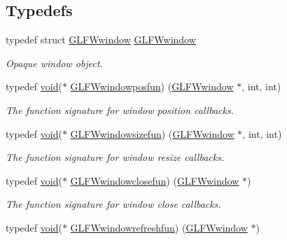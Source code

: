 \subsection*{Typedefs}
\begin{DoxyCompactItemize}
\item 
typedef struct \mbox{\hyperlink{group__window_ga3c96d80d363e67d13a41b5d1821f3242}{G\+L\+F\+Wwindow}} \mbox{\hyperlink{group__window_ga3c96d80d363e67d13a41b5d1821f3242}{G\+L\+F\+Wwindow}}
\begin{DoxyCompactList}\small\item\em Opaque window object. \end{DoxyCompactList}\item 
typedef \mbox{\hyperlink{glad_8h_a950fc91edb4504f62f1c577bf4727c29}{void}}($\ast$ \mbox{\hyperlink{group__window_gafd8db81fdb0e850549dc6bace5ed697a}{G\+L\+F\+Wwindowposfun}}) (\mbox{\hyperlink{group__window_ga3c96d80d363e67d13a41b5d1821f3242}{G\+L\+F\+Wwindow}} $\ast$, int, int)
\begin{DoxyCompactList}\small\item\em The function signature for window position callbacks. \end{DoxyCompactList}\item 
typedef \mbox{\hyperlink{glad_8h_a950fc91edb4504f62f1c577bf4727c29}{void}}($\ast$ \mbox{\hyperlink{group__window_gae49ee6ebc03fa2da024b89943a331355}{G\+L\+F\+Wwindowsizefun}}) (\mbox{\hyperlink{group__window_ga3c96d80d363e67d13a41b5d1821f3242}{G\+L\+F\+Wwindow}} $\ast$, int, int)
\begin{DoxyCompactList}\small\item\em The function signature for window resize callbacks. \end{DoxyCompactList}\item 
typedef \mbox{\hyperlink{glad_8h_a950fc91edb4504f62f1c577bf4727c29}{void}}($\ast$ \mbox{\hyperlink{group__window_ga93e7c2555bd837f4ed8b20f76cada72e}{G\+L\+F\+Wwindowclosefun}}) (\mbox{\hyperlink{group__window_ga3c96d80d363e67d13a41b5d1821f3242}{G\+L\+F\+Wwindow}} $\ast$)
\begin{DoxyCompactList}\small\item\em The function signature for window close callbacks. \end{DoxyCompactList}\item 
typedef \mbox{\hyperlink{glad_8h_a950fc91edb4504f62f1c577bf4727c29}{void}}($\ast$ \mbox{\hyperlink{group__window_ga7a56f9e0227e2cd9470d80d919032e08}{G\+L\+F\+Wwindowrefreshfun}}) (\mbox{\hyperlink{group__window_ga3c96d80d363e67d13a41b5d1821f3242}{G\+L\+F\+Wwindow}} $\ast$)

\end{DoxyCompactItemize}
